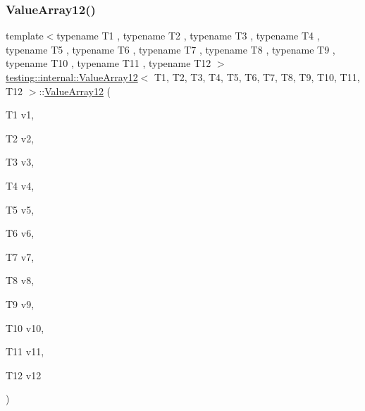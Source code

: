 \subsubsection{\texorpdfstring{ValueArray12()}{ValueArray12()}\hspace{0.1cm}{\footnotesize\ttfamily [1/2]}}
{\footnotesize\ttfamily template$<$typename T1 , typename T2 , typename T3 , typename T4 , typename T5 , typename T6 , typename T7 , typename T8 , typename T9 , typename T10 , typename T11 , typename T12 $>$ \\
\mbox{\hyperlink{classtesting_1_1internal_1_1_value_array12}{testing\+::internal\+::\+Value\+Array12}}$<$ T1, T2, T3, T4, T5, T6, T7, T8, T9, T10, T11, T12 $>$\+::\mbox{\hyperlink{classtesting_1_1internal_1_1_value_array12}{Value\+Array12}} (\begin{DoxyParamCaption}\item[{T1}]{v1,  }\item[{T2}]{v2,  }\item[{T3}]{v3,  }\item[{T4}]{v4,  }\item[{T5}]{v5,  }\item[{T6}]{v6,  }\item[{T7}]{v7,  }\item[{T8}]{v8,  }\item[{T9}]{v9,  }\item[{T10}]{v10,  }\item[{T11}]{v11,  }\item[{T12}]{v12 }\end{DoxyParamCaption})\hspace{0.3cm}{\ttfamily [inline]}}

\mbox{\label{classtesting_1_1internal_1_1_value_array12_a901c95791c3b16ca51fcd7fc1323fef2}} 
